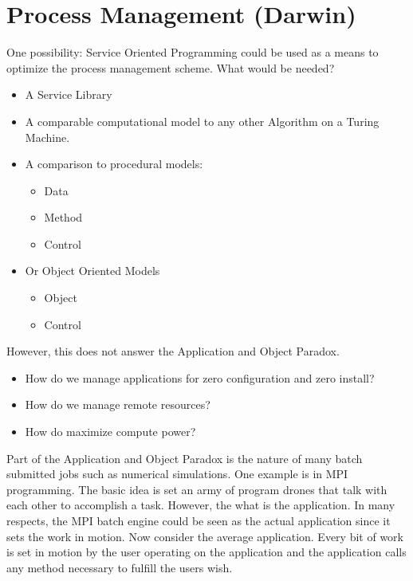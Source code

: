 \documentclass[11pt]{article}
\begin{document}
\section {Process Management (Darwin)} 
One possibility: Service Oriented Programming could be used as a means to optimize the process management scheme.  What would be needed?
\begin{itemize}
\item A Service Library
\item A comparable computational model to any other Algorithm on a Turing Machine.
\item A comparison to procedural models:
\begin{itemize}
\item Data
\item Method
\item Control
\end{itemize}
\item Or Object Oriented Models
\begin{itemize}
\item Object
\item Control
\end{itemize}
\end{itemize}

However, this does not answer the Application and Object Paradox.
\begin{itemize}
\item How do we manage applications for zero configuration and zero install?
\item How do we manage remote resources?
\item How do maximize compute power?
\end{itemize}
Part of the Application and Object Paradox is the nature of many batch submitted jobs such as numerical simulations.  One example is in MPI programming.  The basic idea is set an army of program drones that talk with each other to accomplish a task.  However, the what is the application.  In many respects, the MPI batch engine could be seen as the actual application since it sets the work in motion.   Now consider the average application.  Every bit of work is set in motion by the user operating on the application and the application calls any method necessary to fulfill the users wish.  
\end{document}
